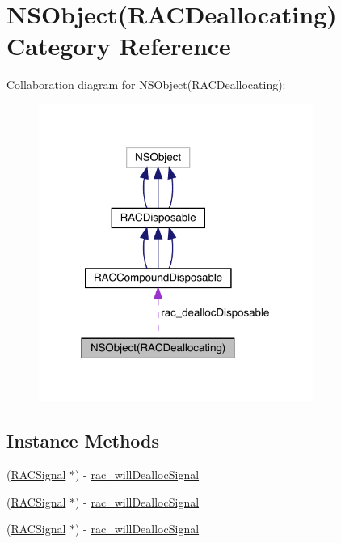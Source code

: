 \hypertarget{category_n_s_object_07_r_a_c_deallocating_08}{}\section{N\+S\+Object(R\+A\+C\+Deallocating) Category Reference}
\label{category_n_s_object_07_r_a_c_deallocating_08}


Collaboration diagram for N\+S\+Object(R\+A\+C\+Deallocating)\+:\nopagebreak
\begin{figure}[H]
\begin{center}
\leavevmode
\includegraphics[width=254pt]{category_n_s_object_07_r_a_c_deallocating_08__coll__graph}
\end{center}
\end{figure}
\subsection*{Instance Methods}
\begin{DoxyCompactItemize}
\item 
(\mbox{\hyperlink{interface_r_a_c_signal}{R\+A\+C\+Signal}} $\ast$) -\/ \mbox{\hyperlink{category_n_s_object_07_r_a_c_deallocating_08_a5a203df4b4af42221797e447090819c7}{rac\+\_\+will\+Dealloc\+Signal}}
\item 
(\mbox{\hyperlink{interface_r_a_c_signal}{R\+A\+C\+Signal}} $\ast$) -\/ \mbox{\hyperlink{category_n_s_object_07_r_a_c_deallocating_08_a5a203df4b4af42221797e447090819c7}{rac\+\_\+will\+Dealloc\+Signal}}
\item 
(\mbox{\hyperlink{interface_r_a_c_signal}{R\+A\+C\+Signal}} $\ast$) -\/ \mbox{\hyperlink{category_n_s_object_07_r_a_c_deallocating_08_a5a203df4b4af42221797e447090819c7}{rac\+\_\+will\+Dealloc\+Signal}}
\end{DoxyCompactItemize}
